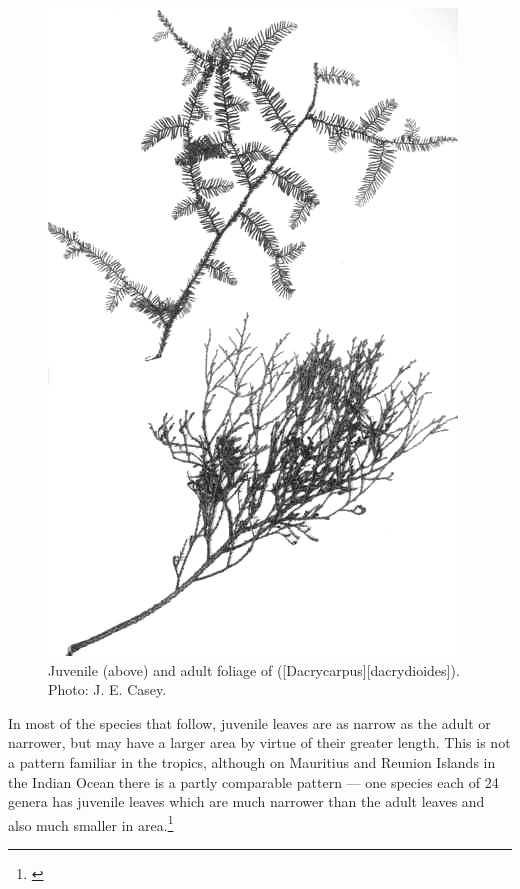 \begin{figure}[t]
\begin{minipage}[t]{\textwidth}
\begin{minipage}[t]{(\textwidth-\fgap) * \real{0.499}}
			\centering
			\includegraphics[width=\textwidth]{graphics/fig_022}
			\caption[Kahikatea foliage]{Juvenile (above) and adult foliage of  ([Dacrycarpus][dacrydioides]).
			Photo: J. E. Casey.}%
			\label{fig:22kahikatea}
		\end{minipage}
	\end{minipage}
\end{figure}

In most of the species that follow, juvenile leaves are as narrow as the adult or narrower, but may have a larger area by virtue of their greater length.
This is not a pattern familiar in the tropics, although on Mauritius and Reunion Islands in the Indian Ocean there is a partly comparable pattern --- one species each of 24 genera has juvenile leaves which are much narrower than the adult leaves and also much smaller in area.\footnote{\cite{friedmann1976observations}}

